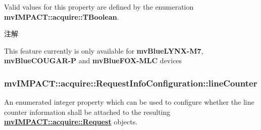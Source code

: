 Valid values for this property are defined by the enumeration {\bfseries mv\+I\+M\+P\+A\+C\+T\+::acquire\+::\+T\+Boolean}. \begin{DoxyNote}{注解}

\begin{DoxyItemize}
\item This feature currently is only available for {\bfseries mv\+Blue\+L\+Y\+N\+X-\/\+M7}, {\bfseries mv\+Blue\+C\+O\+U\+G\+A\+R-\/\+P} and {\bfseries mv\+Blue\+F\+O\+X-\/\+M\+L\+C} devices 
\end{DoxyItemize}
\end{DoxyNote}
\hypertarget{classmv_i_m_p_a_c_t_1_1acquire_1_1_request_info_configuration_ae37add1f5362b9f266c336e27b424576}{
\subsubsection[{line\+Counter}]{ mv\+I\+M\+P\+A\+C\+T\+::acquire\+::\+Request\+Info\+Configuration\+::line\+Counter}}\label{classmv_i_m_p_a_c_t_1_1acquire_1_1_request_info_configuration_ae37add1f5362b9f266c336e27b424576}


An enumerated integer property which can be used to configure whether the line counter information shall be attached to the resulting {\bfseries \hyperlink{classmv_i_m_p_a_c_t_1_1acquire_1_1_request}{mv\+I\+M\+P\+A\+C\+T\+::acquire\+::\+Request}} objects. 

